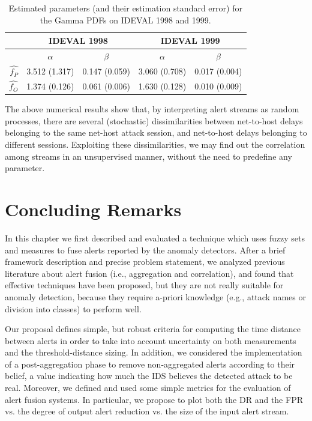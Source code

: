 \begin{table}[t]
  \centering\footnotesize
  \begin{tabular}{rcccc}
    \toprule
    & \multicolumn{2}{c}{\textsc{IDEVAL 1998}} & \multicolumn{2}{c}{\textsc{IDEVAL 1999}}\\
    \midrule
    & $\alpha$ & $\beta$ & $\alpha$ & $\beta$\\
    \midrule
    $\hat{f_{P}}$ & 3.512 (1.317) & 0.147 (0.059) & 3.060 (0.708) & 0.017 (0.004)\\
    $\hat{f_{O}}$ & 1.374 (0.126) & 0.061 (0.006) & 1.630
    (0.128) & 0.010 (0.009)\\
    \bottomrule
  \end{tabular}
  \caption{Estimated parameters (and their estimation standard error) for the Gamma \acp{PDF} on \ac{IDEVAL} 1998 and 1999.}
  \label{tab:1998-1999}
\end{table}

The above numerical results show that, by interpreting alert streams as random processes, there are several (stochastic) dissimilarities between net-to-host delays belonging to the same net-host attack session, and net-to-host delays belonging to different sessions. Exploiting these dissimilarities, we may find out the correlation among streams in an unsupervised manner, without the need to predefine any parameter.

\section{Concluding Remarks}
\label{correlation:conclusions}
In this chapter we first described and evaluated a technique which uses fuzzy sets and measures to fuse alerts reported by the anomaly detectors. After a brief framework description and precise problem statement, we analyzed previous literature about alert fusion (i.e., aggregation and correlation), and found that effective techniques have been proposed, but they are not really suitable for anomaly detection, because they require a-priori knowledge (e.g., attack names or division into classes) to perform well.

Our proposal defines simple, but robust criteria for computing the time distance between alerts in order to take into account uncertainty on both measurements and the threshold-distance sizing. In addition, we considered the implementation of a post-aggregation phase to remove non-aggregated alerts according to their belief, a value indicating how much the \ac{IDS} believes the detected attack to be real. Moreover, we defined and used some simple metrics for the evaluation of alert fusion systems. In particular, we propose to plot both the \ac{DR} and the \ac{FPR} vs. the degree of output alert reduction vs. the size of the input alert stream.

